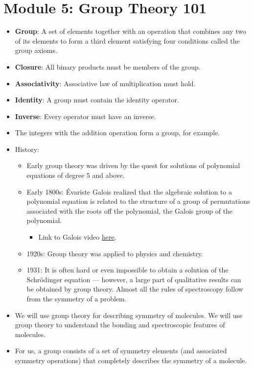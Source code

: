 \documentclass[../notes.tex]{subfiles}
\begin{document}
\section{Module 5: Group Theory 101}
\begin{itemize}
    \item {}\textbf{Group}: A set of elements together with an operation that combines any two of its elements to form a third element satisfying four conditions called the group axioms.
    \item \textbf{Closure}: All binary products must be members of the group.
    \item \textbf{Associativity}: Associative law of multiplication must hold.
    \item \textbf{Identity}: A group must contain the identity operator.
    \item \textbf{Inverse}: Every operator must have an inverse.
    \item The integers with the addition operation form a group, for example.
    \item History:
    \begin{itemize}
        \item Early group theory was driven by the quest for solutions of polynomial equations of degree 5 and above.
        \item Early 1800s: \'{E}variste Galois realized that the algebraic solution to a polynomial equation is related to the structure of a group of permutations associated with the roots off the polynomial, the Galois group of the polynomial.
        \begin{itemize}
            \item Link to Galois video \href{https://www.youtube.com/watch?v=Ct2fyigNgPY}{here}.
        \end{itemize}
        \item 1920s: Group theory was applied to physics and chemistry.
        \item 1931: It is often hard or even impossible to obtain a solution of the Schr\"{o}dinger equation --- however, a large part of qualitative results can be obtained by group theory. Almost all the rules of spectroscopy follow from the symmetry of a problem.
    \end{itemize}
    \item We will use group theory for describing symmetry of molecules. We will use group theory to understand the bonding and spectroscopic features of molecules.
    \item For us, a group consists of a set of symmetry elements (and associated symmetry operations) that completely describes the symmetry of a molecule.

\end{itemize}
\end{document}
